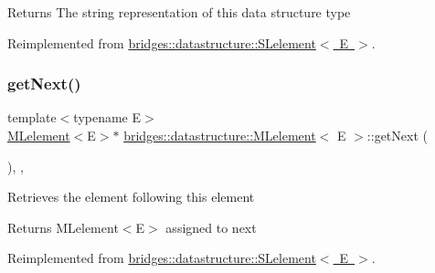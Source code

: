 \begin{DoxyReturn}{Returns}
The string representation of this data structure type 
\end{DoxyReturn}


Reimplemented from \mbox{\hyperlink{classbridges_1_1datastructure_1_1_s_lelement_a602156aacacd73d1faa365d68d8af31b}{bridges\+::datastructure\+::\+S\+Lelement$<$ E $>$}}.

\mbox{\label{classbridges_1_1datastructure_1_1_m_lelement_a47b417db0b948b6899eece572bef9274}} 
\subsubsection{\texorpdfstring{getNext()}{getNext()}\hspace{0.1cm}{\footnotesize\ttfamily [1/2]}}
{\footnotesize\ttfamily template$<$typename E$>$ \\
\mbox{\hyperlink{classbridges_1_1datastructure_1_1_m_lelement}{M\+Lelement}}$<$E$>$$\ast$ \mbox{\hyperlink{classbridges_1_1datastructure_1_1_m_lelement}{bridges\+::datastructure\+::\+M\+Lelement}}$<$ E $>$\+::get\+Next (\begin{DoxyParamCaption}{ }\end{DoxyParamCaption})\hspace{0.3cm}{\ttfamily [inline]}, {\ttfamily [override]}, {\ttfamily [virtual]}}

Retrieves the element following this element

\begin{DoxyReturn}{Returns}
M\+Lelement$<$\+E$>$ assigned to next 
\end{DoxyReturn}


Reimplemented from \mbox{\hyperlink{classbridges_1_1datastructure_1_1_s_lelement_ae43dd771d9ced7cb17f1d35f34cd9a42}{bridges\+::datastructure\+::\+S\+Lelement$<$ E $>$}}.

\mbox{\label{classbridges_1_1datastructure_1_1_m_lelement_a611b3e7d54fdfbc622004a50ca718e6e}} 
